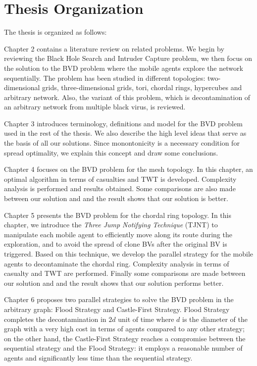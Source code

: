 
\section{Thesis Organization} 

The thesis is organized as follows:

Chapter 2 contains a literature review on related problems. We begin by reviewing the Black Hole Search and Intruder Capture problem, we then focus on the solution to the  BVD problem where the mobile agents explore the network sequentially. The problem has been studied in different topologies: two-dimensional grids, three-dimensional grids, tori, chordal rings, hypercubes and arbitrary network. Also, the variant of this problem, which is decontamination of an arbitrary network from multiple black virus, is   reviewed. 

Chapter 3 introduces terminology, definitions and model for the BVD problem used in the rest of the thesis.   We also describe the high level ideas that serve as the basis of all our solutions. Since monontonicity is a necessary condition for spread optimality, we explain this concept  and draw some  conclusions.

Chapter 4 focuses on the BVD problem for the mesh topology. In this chapter, an optimal algorithm in terms of casualties and TWT is developed. Complexity analysis  is performed and results obtained. Some comparisons  are also made between our solution and \cite{cai} and the result shows that our solution is better.

Chapter 5 presents the BVD problem for the chordal ring topology. In this chapter, we introduce the {\em Three Jump Notifying Technique} (TJNT) to manipulate each mobile agent to efficiently move along its route during the exploration,   and to avoid  the spread of clone BVs after the original BV is triggered. Based on this technique, we develop the parallel strategy for the mobile agents to decontaminate the chordal ring. Complexity analysis in terms of casualty and TWT are performed. Finally some comparisons are made between our solution and \cite{alotaibi} and the result shows that our solution performs better.

 
Chapter 6 proposes two parallel strategies to solve the BVD problem in the arbitrary graph: {\sc Flood} Strategy and {\sc Castle-First} Strategy. Flood Strategy completes the decontamination in $2d$ unit of time where $d$ is the diameter of the graph with a very high  cost  in terms of agents compared to any other   strategy; on the other hand,    the {\sc Castle-First} Strategy reaches a compromise between the sequential strategy and the {\sc Flood} Strategy: it employs  a reasonable number of agents and significantly less time than the sequential strategy.


